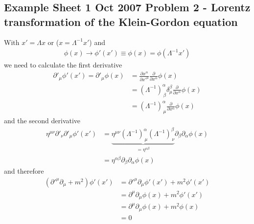 \documentclass[10pt,a4paper]{book}
\theoremstyle{definition}
\begin{document}
\subsection{Example Sheet 1 Oct 2007 Problem 2 - Lorentz transformation of the Klein-Gordon equation}
With $x'=\Lambda x$ or ($x=\Lambda^{-1}x'$) and
\begin{align}
\phi(x)\rightarrow\phi'(x')\equiv\phi(x)=\phi(\Lambda^{-1}x')
\end{align}
we need to calculate the first derivative
\begin{align}
\partial'_\mu\phi'(x')
=\partial'_\mu\phi(x)
&=\frac{\partial x^\alpha}{\partial x'^\mu}\frac{\partial}{\partial x^\alpha}\phi(x)\\
&=(\Lambda^{-1})^\alpha_{\,\beta}\delta^\beta_\mu\frac{\partial}{\partial x^\alpha}\phi(x)\\
&=(\Lambda^{-1})^\alpha_{\,\mu}\frac{\partial}{\partial x^\alpha}\phi(x)
\end{align}
and the second derivative
\begin{align}
\eta^{\mu\nu}\partial'_\nu\partial'_\mu\phi'(x')
&=\underbrace{\eta^{\mu\nu}(\Lambda^{-1})^\alpha_{\,\mu}(\Lambda^{-1})^\beta_{\,\nu}}_{=\eta^{\alpha\beta}}\partial_\beta\partial_\alpha\phi(x)\\
&=\eta^{\alpha\beta}\partial_\beta\partial_\alpha\phi(x)
\end{align}
and therefore
\begin{align}
(\partial'^\mu\partial_\mu+m^2)\phi'(x')
&=\partial'^\mu\partial_\mu\phi'(x')+m^2\phi'(x')\\
&=\partial^\mu\partial_\mu\phi(x)+m^2\phi'(x')\\
&=\partial^\mu\partial_\mu\phi(x)+m^2\phi(x)\\
&=0
\end{align}
\end{document}
